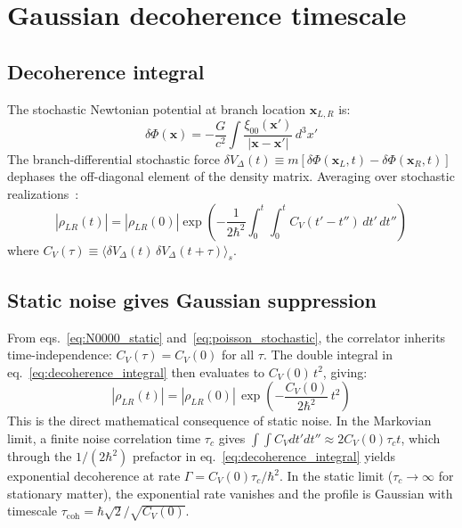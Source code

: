 \documentclass[12pt,a4paper]{article}
\theoremstyle{remark}
\begin{document}
\section{Gaussian decoherence timescale}
\label{sec:gaussian}

\subsection{Decoherence integral}

The stochastic Newtonian potential at branch location $\mathbf{x}_{L,R}$ is:
\begin{equation}
\delta\Phi(\mathbf{x}) = -\frac{G}{c^2}\int \frac{\xi_{00}(\mathbf{x}')}{|\mathbf{x}-\mathbf{x}'|}\,d^3x'
\end{equation}
The branch-differential stochastic force $\delta V_\Delta(t) \equiv m[\delta\Phi(\mathbf{x}_L,t) - \delta\Phi(\mathbf{x}_R,t)]$ dephases the off-diagonal element of the density matrix. Averaging over stochastic realizations~\cite{hu_verdaguer}:
\begin{equation}
|\rho_{LR}(t)| = |\rho_{LR}(0)|\exp\!\left(-\frac{1}{2\hbar^2}\int_0^t\!\!\int_0^t
C_V(t'-t'')\,dt'\,dt''\right)
\label{eq:decoherence_integral}
\end{equation}
where $C_V(\tau) \equiv \langle\delta V_\Delta(t)\,\delta V_\Delta(t+\tau)\rangle_s$.

\subsection{Static noise gives Gaussian suppression}

From eqs.~\eqref{eq:N0000_static} and~\eqref{eq:poisson_stochastic}, the correlator
inherits time-independence: $C_V(\tau) = C_V(0)$ for all $\tau$. The double integral in
eq.~\eqref{eq:decoherence_integral} then evaluates to $C_V(0)\,t^2$, giving:
\begin{equation}
|\rho_{LR}(t)| = |\rho_{LR}(0)|\,\exp\!\left(-\frac{C_V(0)}{2\hbar^2}\,t^2\right)
\label{eq:gaussian_suppression}
\end{equation}
This is the direct mathematical consequence of static noise. In the Markovian limit, a
finite noise correlation time $\tau_c$ gives $\int\int C_V dt'dt'' \approx 2C_V(0)\tau_c
t$, which through the $1/(2\hbar^2)$ prefactor in eq.~\eqref{eq:decoherence_integral}
yields exponential decoherence at rate $\Gamma = C_V(0)\tau_c/\hbar^2$. In the
static limit ($\tau_c\to\infty$ for stationary matter), the exponential rate vanishes and
the profile is Gaussian with timescale $\tau_{\text{coh}} = \hbar\sqrt{2}/\sqrt{C_V(0)}$.
\end{document}
